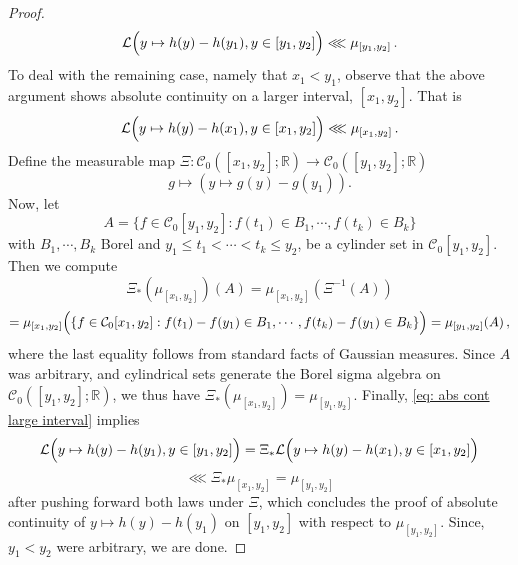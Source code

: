 \documentclass[12pt]{report}
\theoremstyle{plain}
\newcommand{\R}{\ensuremath{\mathbb{R}}}
\begin{document}
\begin{proof}
\[\mathcal{L}\Bigl(y\mapsto h(y)-h(y_1), y\in [y_1, y_2]\Bigr)\lll \mu_{[y_1,y_2]}\,.
\]
To deal with the remaining case, namely that $x_1<y_1$, observe that the above argument shows absolute continuity on a larger interval, $[x_1, y_2]$. That is
\begin{equation}\label{eq: abs cont large interval}
\mathcal{L}\Bigl(y\mapsto h(y)-h(x_1), y\in [x_1, y_2]\Bigr)\lll \mu_{[x_1,y_2]}\,.
\end{equation}
Define the measurable map $\Xi: \mathcal{C}_0([x_1,y_2];\R) \to \mathcal{C}_0([y_1, y_2];\R)$ \[g\mapsto (y\mapsto g(y)-g(y_1)).\]
Now, let
\[
A = \{f\in \mathcal{C}_0[y_1, y_2]:f(t_1)\in B_1, \cdots, f(t_k)\in B_{k}\}
\]
with $B_1, \cdots, B_k$ Borel and $y_1\leq t_1<\cdots<t_k\leq y_2$, be a cylinder set in $\mathcal{C}_0[y_1,y_2]$. Then we compute 
\[
\Xi_*(\mu_{[x_1,y_2]})(A) = \mu_{[x_1,y_2]}(\Xi^{-1}(A))
\]
\[
= \mu_{[x_1,y_2]}\Bigl(\{f\in \mathcal{C}_0[x_1, y_2]:f(t_1)-f(y_1)\in B_1, \cdots, f(t_k)-f(y_1)\in B_{k}\}\Bigr) = \mu_{[y_1,y_2]}(A)\,,
\]
where the last equality follows from standard facts of Gaussian measures. Since $A$ was arbitrary, and cylindrical sets generate the Borel sigma algebra on $\mathcal{C}_0([y_1, y_2];\R)$, we thus have $\Xi_*(\mu_{[x_1,y_2]}) = \mu_{[y_1,y_2]}$. Finally, \ref{eq: abs cont large interval} implies 
\[
\mathcal{L}\Bigl(y\mapsto h(y)-h(y_1), y\in [y_1, y_2]\Bigr)
=\Xi_*\mathcal{L}\Bigl(y\mapsto h(y)-h(x_1), y\in [x_1, y_2]\Bigr)\]
\[
\lll \Xi_*\mu_{[x_1,y_2]} = \mu_{[y_1,y_2]}
\]
after pushing forward both laws under $\Xi$, which concludes the proof of absolute continuity of $y\mapsto h(y)-h(y_1)$ on $[y_1,y_2]$ with respect to $\mu_{[y_1,y_2]}$. Since, $y_1<y_2$ were arbitrary, we are done.

\end{proof}
\end{document}
